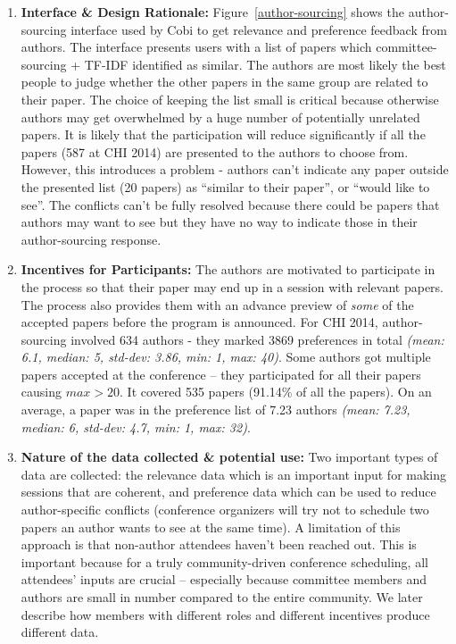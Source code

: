 \documentclass[letterpaper]{article}
\begin{document}
\begin{enumerate}[I]
\item \textbf{Interface \& Design Rationale:} Figure~\ref{author-sourcing} shows the author-sourcing interface used by Cobi to get relevance and preference feedback from authors. The interface presents users with a list of papers which committee-sourcing + TF-IDF identified as similar. The authors are most likely the best people to judge whether the other papers in the same group are related to their paper. The choice of keeping the list small is critical because otherwise authors may get overwhelmed by a huge number of potentially unrelated papers. It is likely that the participation will reduce significantly if all the papers (587 at CHI 2014) are presented to the authors to choose from. However, this introduces a problem - authors can't indicate any paper outside the presented list (20 papers) as ``similar to their paper'', or ``would like to see''. The conflicts can't be fully resolved because there could be papers that authors may want to see but they have no way to indicate those in their author-sourcing response.
\\
\item \textbf{Incentives for Participants:} The authors are motivated to participate in the process so that their paper may end up in a session with relevant papers. The process also provides them with an advance preview of \emph{some} of the accepted papers before the program is announced. For CHI 2014, author-sourcing involved 634 authors - they marked 3869 preferences in total \emph{(mean: 6.1, median: 5, std-dev: 3.86, min: 1, max: 40)}. Some authors got multiple papers accepted at the conference -- they participated for all their papers causing  $max > 20$. It covered 535 papers (91.14\% of all the papers). On an average, a paper was in the preference list of 7.23 authors \emph{(mean: 7.23, median: 6, std-dev: 4.7, min: 1, max: 32)}.
\\
\item \textbf{Nature of the data collected \& potential use:} Two important types of data are collected: the relevance data which is an important input for making sessions that are coherent, and preference data which can be used to reduce author-specific conflicts (conference organizers will try not to schedule two papers an author wants to see at the same time). A limitation of this approach is that non-author attendees haven't been reached out. This is important because for a truly community-driven conference scheduling, all attendees' inputs are crucial -- especially because committee members and authors are small in number compared to the entire community. We later describe how members with different roles and different incentives produce different data.
\end{enumerate}
\end{document}
